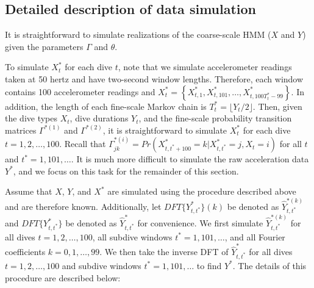 
\subsection{Detailed description of data simulation}

It is straightforward to simulate realizations of the coarse-scale HMM ($X$ and $Y$) given the parameters $\Gamma$ and $\theta$. 

To simulate $X^*_t$ for each dive $t$, note that we simulate accelerometer readings taken at 50 hertz and have two-second window lengths. Therefore, each window contains 100 accelerometer readings and $X^*_t = \left\{X^*_{t,1}, X^*_{t,101}, \ldots, X^*_{t,100T^*_t-99}\right\}$. In addition, the length of each fine-scale Markov chain is $T^*_t = \lfloor Y_t/2 \rfloor$. Then, given the dive types $X_t$, dive durations $Y_t$, and the fine-scale probability transition matrices $\Gamma^{*(1)}$ and $\Gamma^{*(2)}$, it is straightforward to simulate $X^*_t$ for each dive $t = 1,2,\ldots,100$. Recall that $\Gamma^{*(i)}_{jk} = Pr(X^*_{t,t^*+100} = k | X^*_{t,t^*} = j, X_t = i)$ for all $t$ and $t^* = 1, 101, \ldots$. It is much more difficult to simulate the raw acceleration data $Y^*$, and we focus on this task for the remainder of this section. 

Assume that $X$, $Y$, and $X^*$ are simulated using the procedure described above and are therefore known. Additionally, let $DFT\{Y^*_{t,t^*}\}(k)$ be denoted as $\hat{Y}^{*(k)}_{t,t^*}$ and $DFT\{Y^*_{t,t^*}\}$ be denoted as $\hat{Y}^*_{t,t^*}$ for convenience. We first simulate $\hat Y^{*(k)}_{t,t^*}$ for all dives $t = 1,2,\ldots,100$, all subdive windows $t^* = 1,101,\ldots$, and all Fourier coefficients $k = 0,1,\ldots,99$. We then take the inverse DFT of $\hat{Y}^*_{t,t^*}$ for all dives $t = 1,2,\ldots,100$ and subdive windows $t^* = 1,101,\ldots$ to find $Y^*$. The details of this procedure are described below:

